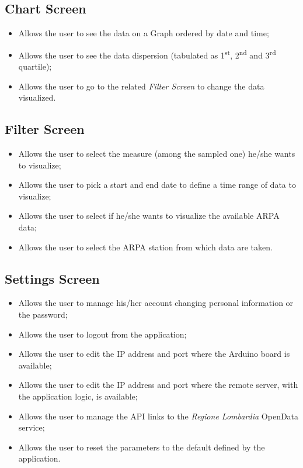 \subsection{Chart Screen}
\begin{itemize}
    \item Allows the user to see the data on a Graph ordered by date and time;
    \item Allows the user to see the data dispersion (tabulated as 1\textsuperscript{st}, 2\textsuperscript{nd} and 3\textsuperscript{rd} quartile);
    \item Allows the user to go to the related \textit{Filter Screen} to change the data visualized.
\end{itemize}
    
\subsection{Filter Screen}
\begin{itemize}
    \item Allows the user to select the measure (among the sampled one) he/she wants to visualize;
    \item Allows the user to pick a start and end date to define a time range of data to visualize;
    \item Allows the user to select if he/she wants to visualize the available ARPA data;
    \item Allows the user to select the ARPA station from which data are taken.
\end{itemize}
    
\subsection{Settings Screen}
\begin{itemize}
    \item Allows the user to manage his/her account changing personal information or the password;
    \item Allows the user to logout from the application;
    \item Allows the user to edit the IP address and port where the Arduino board is available;
    \item Allows the user to edit the IP address and port where the remote server, with the application logic, is available;
    \item Allows the user to manage the API links to the \textit{Regione Lombardia} OpenData service;
    \item Allows the user to reset the parameters to the default defined by the application.
\end{itemize}

